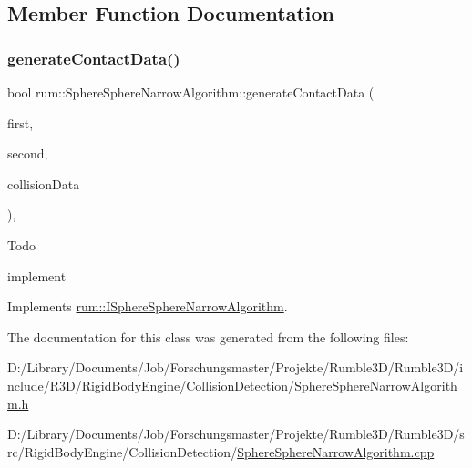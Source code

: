 \subsection{Member Function Documentation}
\mbox{\label{classrum_1_1_sphere_sphere_narrow_algorithm_a218ae392c2dde145a4c1fdd3c687f912}} 
\subsubsection{\texorpdfstring{generate\+Contact\+Data()}{generateContactData()}}
{\footnotesize\ttfamily bool rum\+::\+Sphere\+Sphere\+Narrow\+Algorithm\+::generate\+Contact\+Data (\begin{DoxyParamCaption}\item[{\mbox{\hyperlink{classrum_1_1_collision_sphere}{Collision\+Sphere}} $\ast$}]{first,  }\item[{\mbox{\hyperlink{classrum_1_1_collision_sphere}{Collision\+Sphere}} $\ast$}]{second,  }\item[{\mbox{\hyperlink{classrum_1_1_collision_data}{Collision\+Data}} \&}]{collision\+Data }\end{DoxyParamCaption})\hspace{0.3cm}{\ttfamily [override]}, {\ttfamily [virtual]}}

\begin{DoxyRefDesc}{Todo}
\item[\mbox{\hyperlink{todo__todo000004}{Todo}}]implement \end{DoxyRefDesc}


Implements \mbox{\hyperlink{classrum_1_1_i_sphere_sphere_narrow_algorithm_a254273c64cab0473820639283f1e5e6f}{rum\+::\+I\+Sphere\+Sphere\+Narrow\+Algorithm}}.



The documentation for this class was generated from the following files\+:\begin{DoxyCompactItemize}
\item 
D\+:/\+Library/\+Documents/\+Job/\+Forschungsmaster/\+Projekte/\+Rumble3\+D/\+Rumble3\+D/include/\+R3\+D/\+Rigid\+Body\+Engine/\+Collision\+Detection/\mbox{\hyperlink{_sphere_sphere_narrow_algorithm_8h}{Sphere\+Sphere\+Narrow\+Algorithm.\+h}}\item 
D\+:/\+Library/\+Documents/\+Job/\+Forschungsmaster/\+Projekte/\+Rumble3\+D/\+Rumble3\+D/src/\+Rigid\+Body\+Engine/\+Collision\+Detection/\mbox{\hyperlink{_sphere_sphere_narrow_algorithm_8cpp}{Sphere\+Sphere\+Narrow\+Algorithm.\+cpp}}\end{DoxyCompactItemize}
